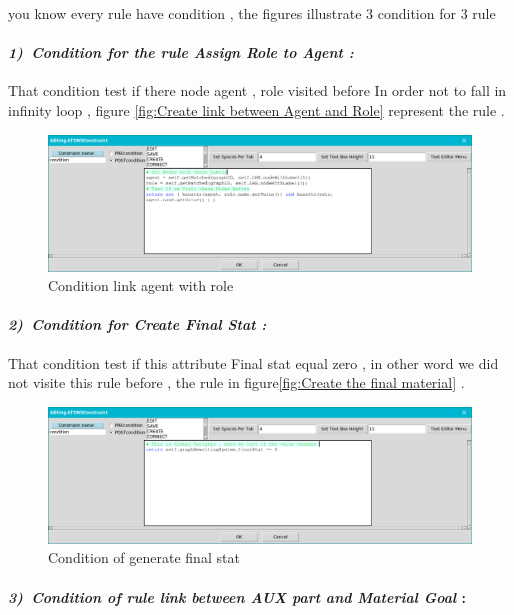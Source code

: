 you know  every rule have condition , the figures illustrate 3 condition for 3 rule 

 
\paragraph{\emph{1)~Condition for the rule   Assign Role to Agent  :  } } 
 
That condition test if there node agent , role visited before 
In order not to fall in infinity loop , figure \ref{fig:Create link between Agent and Role} represent the rule .
 
\begin{figure}[th]
	\centering
 	\includegraphics[scale=0.37]{Chapiter3/img/condrule1}
	\caption{\label{fig:Condition link agent with role}Condition link agent with role  }
\end{figure} 
\pagebreak 
\paragraph{\emph{2)~Condition for Create Final Stat : } } 
That condition test if this attribute Final stat equal zero 
, in other word we did not visite this rule before , the rule in figure\ref{fig:Create the final material} .
 
 
\begin{figure}[th]
	\centering
 	\includegraphics[scale=0.37]{Chapiter3/img/condfinal}
	\caption{\label{fig:Condition of generate final stat } Condition of generate final stat }
\end{figure} 
 

\paragraph{\emph{3)~Condition of rule link between AUX part and Material Goal } : }
  
